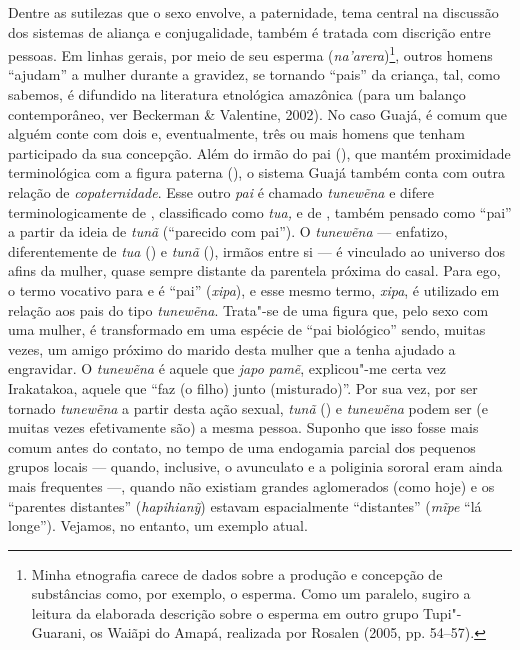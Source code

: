 Dentre as sutilezas que o sexo envolve, a paternidade, tema central na
discussão dos sistemas de aliança e conjugalidade, também é tratada com
discrição entre pessoas. Em linhas gerais, por meio de seu esperma
(\emph{na'arera})\footnote{Minha etnografia carece de dados sobre a
  produção e concepção de substâncias como, por exemplo, o esperma. Como
  um paralelo, sugiro a leitura da elaborada descrição sobre o esperma
  em outro grupo Tupi"-Guarani, os Waiãpi do Amapá, realizada por Rosalen
  (2005, pp. 54--57).}, outros homens ``ajudam'' a mulher durante a
gravidez, se tornando ``pais'' da criança, tal, como sabemos, é
difundido na literatura etnológica amazônica (para um balanço
contemporâneo, ver Beckerman \& Valentine, 2002). No caso Guajá, é comum
que alguém conte com dois e, eventualmente, três ou mais homens que
tenham participado da sua concepção. Além do irmão do pai (), que
mantém proximidade terminológica com a figura paterna (), o sistema
Guajá também conta com outra relação de \emph{copaternidade}. Esse outro
\emph{pai} é chamado \emph{tunewẽna} e difere terminologicamente de ,
classificado como \emph{tua,} e de , também pensado como ``pai'' a
partir da ideia de \emph{tunã} (``parecido com pai''). O \emph{tunewẽna}
--- enfatizo, diferentemente de \emph{tua} () e \emph{tunã} (), irmãos
entre si --- é vinculado ao universo dos afins da mulher, quase sempre
distante da parentela próxima do casal. Para ego, o termo vocativo para
 e  é ``pai'' (\emph{xipa}), e esse mesmo termo, \emph{xipa}, é
utilizado em relação aos pais do tipo \emph{tunewẽna}. Trata"-se de uma
figura que, pelo sexo com uma mulher, é transformado em uma espécie de
``pai biológico'' sendo, muitas vezes, um amigo próximo do marido desta
mulher que a tenha ajudado a engravidar. O \emph{tunewẽna} é aquele que
\emph{japo pamẽ}, explicou"-me certa vez Irakatakoa, aquele que ``faz (o
filho) junto (misturado)''. Por sua vez, por ser tornado \emph{tunewẽna}
a partir desta ação sexual, \emph{tunã} () e \emph{tunewẽna} podem ser
(e muitas vezes efetivamente são) a mesma pessoa. Suponho que isso fosse
mais comum antes do contato, no tempo de uma endogamia parcial dos
pequenos grupos locais --- quando, inclusive, o avunculato e a poliginia
sororal eram ainda mais frequentes ---, quando não existiam grandes
aglomerados (como hoje) e os ``parentes distantes'' (\emph{hapihianỹ})
estavam espacialmente ``distantes'' (\emph{mĩpe} ``lá longe''). Vejamos,
no entanto, um exemplo atual.

